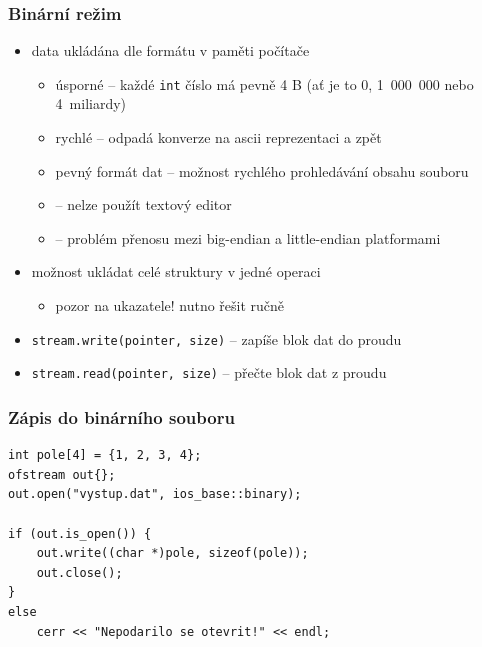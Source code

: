 \begin{frame}[fragile]
\frametitle{Binární režim}
\begin{block}{}
\begin{itemize}
\item data ukládána dle formátu v paměti počítače
\begin{itemize}
\item úsporné -- každé \lstinline|int| číslo má pevně 4 B (ať je to 0, 1~000~000 nebo 4~miliardy)
\item rychlé -- odpadá konverze na ascii reprezentaci a zpět
\item pevný formát dat -- možnost rychlého prohledávání obsahu souboru
\item {} -- nelze použít textový editor
\item {} -- problém přenosu mezi big-endian a little-endian platformami
\end{itemize}
\item možnost ukládat celé struktury v jedné operaci
\begin{itemize}
\item pozor na ukazatele! nutno řešit ručně
\end{itemize}
\end{itemize}
\end{block}

\begin{block}{}
\begin{itemize}
\item \lstinline|stream.write(pointer, size)| -- zapíše blok dat do proudu
\item \lstinline|stream.read(pointer, size)| -- přečte blok dat z proudu
\end{itemize}
\end{block}
\end{frame}






\begin{frame}[fragile]
\frametitle{Zápis do binárního souboru}
\begin{yesblock}
\begin{lstlisting}
int pole[4] = {1, 2, 3, 4}; 
ofstream out{}; 
out.open("vystup.dat", ios_base::binary); 

if (out.is_open()) { 
	out.write((char *)pole, sizeof(pole)); 	
	out.close(); 
} 
else 
	cerr << "Nepodarilo se otevrit!" << endl;
\end{lstlisting}
\end{yesblock}
\end{frame}




